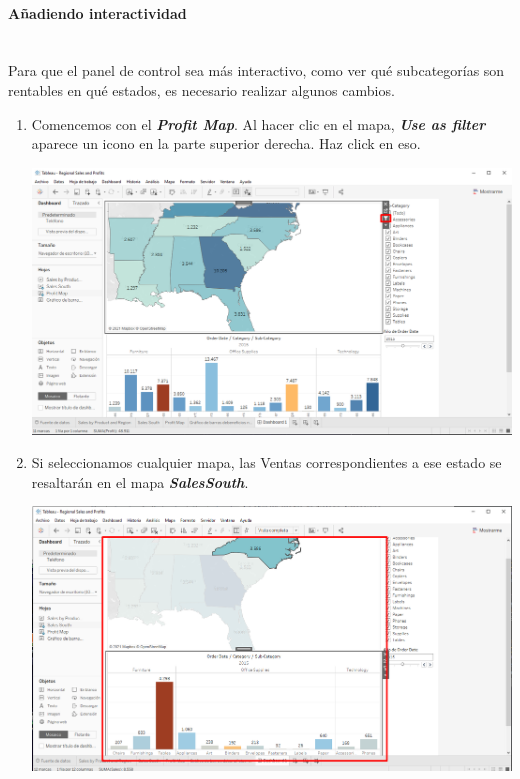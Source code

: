 \documentclass[12pt,letterpaper]{article}
\begin{document}
    \paragraph{\large Añadiendo interactividad\\ \\}
    Para que el panel de control sea más interactivo, como ver qué subcategorías son rentables en qué estados, es necesario realizar algunos cambios.
    \begin{enumerate}
        \item Comencemos con el \textit{\textbf{Profit Map}}. Al hacer clic en el mapa, \textit{\textbf{Use as filter}} aparece un icono en la parte superior derecha. Haz click en eso.
        \begin{center}
            \includegraphics[width=15cm]{./img/img81.png}
        \end{center}
        \item Si seleccionamos cualquier mapa, las Ventas correspondientes a ese estado se resaltarán en el mapa \textit{\textbf{SalesSouth}}.
        \begin{center}
            \includegraphics[width=15cm]{./img/img82.png}

\end{center}
\end{enumerate}
\end{document}
